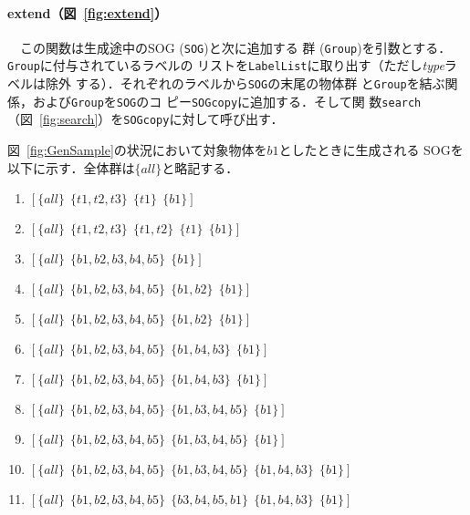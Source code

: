 \documentclass[japanese]{jnlp_1.2}
\def\mrel#1{}
\def\mextrel{}
\begin{document}
\paragraph{extend（図~\ref{fig:extend}）}
　この関数は生成途中のSOG (\texttt{SOG})と次に追加する
群 (\texttt{Group})を引数とする．\texttt{Group}に付与されているラベルの
リストを\texttt{LabelList}に取り出す（ただし\textit{type}ラベルは除外
する）．それぞれのラベルから\texttt{SOG}の末尾の物体群
と\texttt{Group}を結ぶ関係，および\texttt{Group}を\texttt{SOG}のコ
ピー\texttt{SOGcopy}に追加する．そして関
数\texttt{search}（図~\ref{fig:search}）を\texttt{SOGcopy}に対して呼び出す．

図~\ref{fig:GenSample}の状況において対象物体を$b1$としたときに生成される
SOGを以下に示す．全体群は$\{all\}$と略記する．
\begin{enumerate}
\item $[\{all\}\ \mrel{type}\ \{t1,t2,t3\}\ \mrel{space}\ \{t1\}\ \mextrel\ \{b1\}]$
\item $[\{all\}\ \mrel{type}\ \{t1,t2,t3\}\ \mrel{shape}\ \{t1,t2\}\ \mrel{space}\ \{t1\}\ \mextrel\ \{b1\}]$
\item $[\{all\}\ \mrel{type}\ \{b1,b2,b3,b4,b5\}\ \mrel{space}\ \{b1\}]$
\item $[\{all\}\ \mrel{type}\ \{b1,b2,b3,b4,b5\}\ \mrel{color}\ \{b1,b2\}\ \mrel{space}\ \{b1\}]$
\item $[\{all\}\ \mrel{type}\ \{b1,b2,b3,b4,b5\}\ \mrel{color}\ \{b1,b2\}\ \mrel{size}\ \{b1\}]$
\item $[\{all\}\ \mrel{type}\ \{b1,b2,b3,b4,b5\}\ \mrel{size}\ \{b1,b4,b3\}\ \mrel{space}\ \{b1\}]$
\item $[\{all\}\ \mrel{type}\ \{b1,b2,b3,b4,b5\}\ \mrel{size}\ \{b1,b4,b3\}\ \mrel{color}\ \{b1\}]$
\item $[\{all\}\ \mrel{type}\ \{b1,b2,b3,b4,b5\}\ \mrel{space}\ \{b1,b3,b4,b5\}\ \mrel{space}\ \{b1\}]$
\item $[\{all\}\ \mrel{type}\ \{b1,b2,b3,b4,b5\}\ \mrel{space}\ \{b1,b3,b4,b5\}\ \mrel{color}\ \{b1\}]$
\item $[\{all\}\ \mrel{type}\ \{b1,b2,b3,b4,b5\}\ \mrel{space}\ \{b1,b3,b4,b5\}\ \mrel{size}\ \{b1,b4,b3\}\ \mrel{space}\ \{b1\}]$
\item $[\{all\}\ \mrel{type}\ \{b1,b2,b3,b4,b5\}\ \mrel{space}\ \{b3,b4,b5,b1\}\ \mrel{size}\ \{b1,b4,b3\}\ \mrel{color}\ \{b1\}]$
\end{enumerate}
\end{document}
